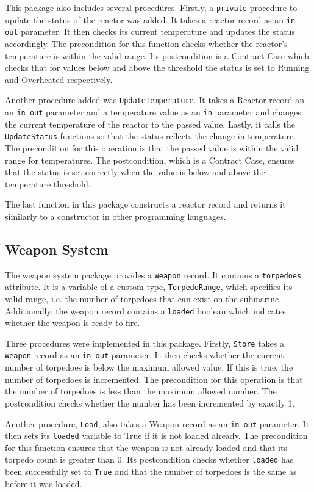 \documentclass{llncs}
\begin{document}
This package also includes several procedures. Firstly, a \texttt{private} procedure to update the status of the reactor was added. It takes a reactor record as an \texttt{in out} parameter. It then checks its current temperature and updates the status accordingly. The precondition for this function checks whether the reactor's temperature is within the valid range. Its postcondition is a Contract Case which checks that for values below and above the threshold the status is set to Running and Overheated respectively. 

Another procedure added was \texttt{UpdateTemperature}. It takes a Reactor record an an \texttt{in out} parameter and a temperature value as an \texttt{in} parameter and changes the current temperature of the reactor to the passed value. Lastly, it calls the \texttt{UpdateStatus} functions so that the status reflects the change in temperature. The precondition for this operation is that the passed value is within the valid range for temperatures. The postcondition, which is a Contract Case, ensures that the status is set correctly when the value is below and above the temperature threshold.

The last function in this package constructs a reactor record and returns it similarly to a constructor in other programming languages.

\subsection{Weapon System}
The weapon system package provides a \texttt{Weapon} record. It contains a \texttt{torpedoes} attribute. It is a variable of a custom type, \texttt{TorpedoRange}, which specifies its valid range, i.e. the number of torpedoes that can exist on the submarine. Additionally, the weapon record contains a \texttt{loaded} boolean which indicates whether the weapon is ready to fire. 

Three procedures were implemented in this package. Firstly, \texttt{Store} takes a \texttt{Weapon} record as an \texttt{in out} parameter. It then checks whether the current number of torpedoes is below the maximum allowed value. If this is true, the number of torpedoes is incremented. The precondition for this operation is that the number of torpedoes is less than the maximum allowed number. The postcondition checks whether the number has been incremented by exactly 1.

Another procedure, \texttt{Load}, also takes a Weapon record as an \texttt{in out} parameter. It then sets its \texttt{loaded} variable to True if it is not loaded already. The precondition for this function ensures that the weapon is not already loaded and that its torpedo count is greater than 0. Its postcondition checks whether \texttt{loaded} has been successfully set to \texttt{True} and that the number of torpedoes is the same as before it was loaded.
\end{document}
